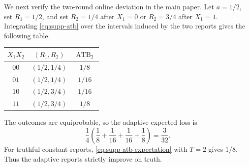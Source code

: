\documentclass[twoside]{article}
\newcommand{\1}{\mathbf 1}
\begin{document}
We next verify the two-round online deviation in the main paper. Let
$a=1/2$, set $R_1=1/2$, and set $R_2=1/4$ after $X_1=0$ or $R_2=3/4$
after $X_1=1$. Integrating \eqref{eq:supp-atb} over the intervals induced by
the two reports gives the following table.
\begin{center}
\begin{tabular}{ccc}
\toprule
$X_1X_2$ & $(R_1,R_2)$ & $\operatorname{ATB}_2$\\
\midrule
$00$ & $(1/2,1/4)$ & $1/8$\\
$01$ & $(1/2,1/4)$ & $1/16$\\
$10$ & $(1/2,3/4)$ & $1/16$\\
$11$ & $(1/2,3/4)$ & $1/8$\\
\bottomrule
\end{tabular}
\end{center}
The outcomes are equiprobable, so the adaptive expected loss is
\begin{equation*}
 \frac14\left(\frac18+\frac1{16}+\frac1{16}+\frac18\right)
 =\frac3{32}.
\end{equation*}
For truthful constant reports, \eqref{eq:supp-atb-expectation} with $T=2$
gives $1/8$. Thus the adaptive reports strictly improve on truth.


\end{document}
